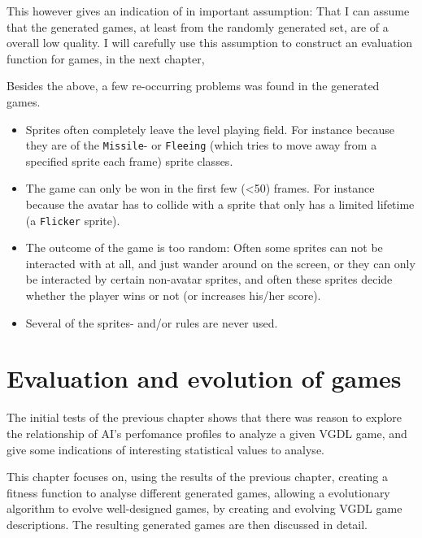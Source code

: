 \documentclass[a4paper,titlepage,final]{report}
\begin{document}
This however gives an indication of in important assumption: That I can assume that the generated games, at least from the randomly generated set, are of a overall low quality.
I will carefully use this assumption to construct an evaluation function for games, in the next chapter,

Besides the above, a few re-occurring problems was found in the generated games.

\begin{itemize}
\item Sprites often completely leave the level playing field. 
For instance because they are of the \texttt{Missile}- or \texttt{Fleeing} (which tries to move away from a specified sprite each frame) sprite classes.
\item The game can only be won in the first few (<50) frames. 
For instance  because the avatar has to collide with a sprite that only has a limited lifetime (a \texttt{Flicker} sprite).
\item The outcome of the game is too random: 
Often some sprites can not be interacted with at all, and just wander around on the screen, or they can only be interacted by certain non-avatar sprites, and often these sprites decide whether the player wins or not (or increases his/her score).
\item Several of the sprites- and/or rules are never used.
\end{itemize}





\chapter{Evaluation and evolution of games}
\label{ch_task2}

The initial tests of the previous chapter shows that there was reason to explore the relationship of AI's perfomance profiles to analyze a given VGDL game, and give some indications of interesting statistical values to analyse.

This chapter focuses on, using the results of the previous chapter, creating a fitness function to analyse different generated games, allowing a evolutionary algorithm to evolve well-designed games, by creating and evolving VGDL game descriptions.
The resulting generated games are then discussed in detail.
\end{document}
